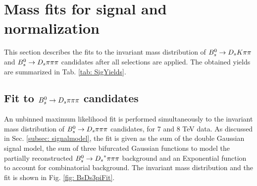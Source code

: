 \section{Mass fits for signal and normalization}
\label{sec: fitting}

This section describes the fits to the invariant mass distribution of ${{B}^0_{s}}\rightarrow{\ensuremath{{D}_{s}}}{\ensuremath{K}}{\ensuremath{\pi}}{\ensuremath{\pi}}$ and ${{B}^0_{s}}\rightarrow{\ensuremath{{D}_{s}}}{\ensuremath{\pi}}{\ensuremath{\pi}}{\ensuremath{\pi}}$ candidates after all selections are applied. 
The obtained yields are summarized in Tab. \ref{tab: SigYields}.

\subsection{Fit to ${{B}^0_{s}}\rightarrow{\ensuremath{{D}_{s}}}{\ensuremath{\pi}}{\ensuremath{\pi}}{\ensuremath{\pi}}$ candidates}
\label{subsec: NormFit}

An unbinned maximum likelihood fit is performed simultaneously to the invariant mass distribution of ${{B}^0_{s}}\rightarrow{\ensuremath{{D}_{s}}}{\ensuremath{\pi}}{\ensuremath{\pi}}{\ensuremath{\pi}}$ candidates, for 7 and 8 TeV data. 
As discussed in Sec. \ref{subsec: signalmodel}, the fit is given as the sum of the double Gaussian signal model, the sum of three bifurcated Gaussian functions to model the partially reconstructed ${{B}^0_{s}}\rightarrow{\ensuremath{{D}_{s}}}^{*}{\pi}{\pi}{\pi}$ background and an Exponential function to account for combinatorial background. The invariant mass distribution and the fit is shown in Fig. \ref{fig: BsDs3piFit}.

